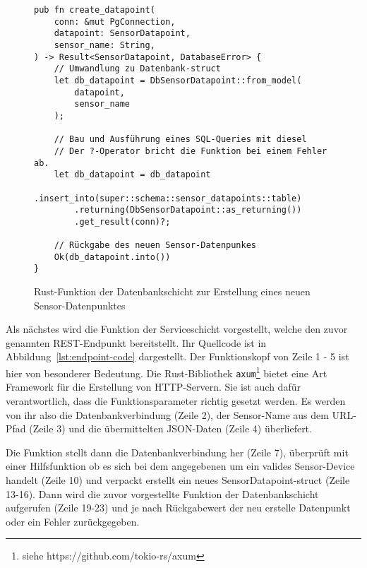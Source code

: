     \begin{figure}[H]
        \centering
        \begin{verbatim}
pub fn create_datapoint(
    conn: &mut PgConnection,
    datapoint: SensorDatapoint,
    sensor_name: String,
) -> Result<SensorDatapoint, DatabaseError> {
    // Umwandlung zu Datenbank-struct
    let db_datapoint = DbSensorDatapoint::from_model(
        datapoint,
        sensor_name
    );

    // Bau und Ausführung eines SQL-Queries mit diesel
    // Der ?-Operator bricht die Funktion bei einem Fehler ab.
    let db_datapoint = db_datapoint
        .insert_into(super::schema::sensor_datapoints::table)
        .returning(DbSensorDatapoint::as_returning())
        .get_result(conn)?; 

    // Rückgabe des neuen Sensor-Datenpunkes
    Ok(db_datapoint.into())
}
        \end{verbatim}
        \caption{Rust-Funktion der Datenbankschicht zur Erstellung eines neuen Sensor-Datenpunktes}
        \label{lst:database-code}
    \end{figure}

    Als nächstes wird die Funktion der Serviceschicht vorgestellt, welche den zuvor genannten REST-Endpunkt bereitstellt.
    Ihr Quellcode ist in Abbildung~\ref{lst:endpoint-code} dargestellt.
    Der Funktionskopf von Zeile 1 - 5 ist hier von besonderer Bedeutung.
    Die Rust-Bibliothek \lstinline{axum}\footnote{siehe https://github.com/tokio-rs/axum} bietet eine Art Framework für die Erstellung von HTTP-Servern.
    Sie ist auch dafür verantwortlich, dass die Funktionsparameter richtig gesetzt werden.
    Es werden von ihr also die Datenbankverbindung (Zeile 2), der Sensor-Name aus dem URL-Pfad (Zeile 3) und die übermittelten JSON-Daten (Zeile 4) überliefert.

    Die Funktion stellt dann die Datenbankverbindung her (Zeile 7), überprüft mit einer Hilfsfunktion ob es sich bei dem angegebenen um ein valides Sensor-Device handelt (Zeile 10) und verpackt erstellt ein neues SensorDatapoint-struct (Zeile 13-16).
    Dann wird die zuvor vorgestellte Funktion der Datenbankschicht aufgerufen (Zeile 19-23) und je nach Rückgabewert der neu erstelle Datenpunkt oder ein Fehler zurückgegeben.

